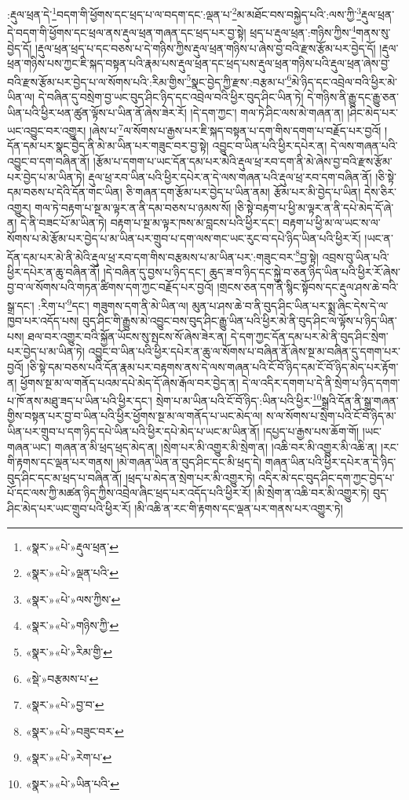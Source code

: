 :རྡུལ་ཕྲན་དེ་\footnote{«སྣར་»«པེ་»རྡུལ་ཕྲན་}བདག་གི་ཕྱོགས་དང་ཕྲད་པ་ལ་བདག་དང་:ལྡན་པ་\footnote{«སྣར་»«པེ་»ལྡན་པའི་}མ་མཐོང་བས་བསྐྱེད་པའི་:ལས་ཀྱི་\footnote{«སྣར་»«པེ་»ལས་ཀྱིས་}རྡུལ་ཕྲན་དེ་བདག་གི་ཕྱོགས་དང་ཕྲལ་ནས་རྡུལ་ཕྲན་གཞན་དང་ཕྲད་པར་བྱ་སྟེ། ཕྲད་པ་རྡུལ་ཕྲན་:གཉིས་ཀྱིས་\footnote{«སྣར་»«པེ་»གཉིས་ཀྱི་}གནས་སུ་བྱེད་དོ། །རྡུལ་ཕྲན་ཕྲད་པ་དང་བཅས་པ་དེ་གཉིས་ཀྱིས་རྡུལ་ཕྲན་གཉིས་པ་ཞེས་བྱ་བའི་རྫས་རྩོམ་པར་བྱེད་དོ། །རྡུལ་ཕྲན་གཉིས་པས་ཀྱང་ཇི་སྐད་བསྟན་པའི་རྣམ་པས་རྡུལ་ཕྲན་དང་ཕྲད་པས་རྡུལ་ཕྲན་གཉིས་པའི་རྡུལ་ཕྲན་ཞེས་བྱ་བའི་རྫས་རྩོམ་པར་བྱེད་པ་ལ་སོགས་པའི་:རིམ་གྱིས་\footnote{«སྣར་»«པེ་»རིམ་གྱི་}སྣང་བྱེད་ཀྱི་རྫས་:བརྩམ་པ་\footnote{«སྡེ་»བརྩམས་པ་}མེ་ཉིད་དང་འབྲེལ་བའི་ཕྱིར་མེ་ཡིན་ལ། དེ་བཞིན་དུ་བསྲེག་བྱ་ཡང་བུད་ཤིང་ཉིད་དང་འབྲེལ་བའི་ཕྱིར་བུད་ཤིང་ཡིན་ཏེ། དེ་གཉིས་ནི་རྒྱུ་དང་རྒྱུ་ཅན་ཡིན་པའི་ཕྱིར་ཕན་ཚུན་ལྟོས་པ་ཡིན་ནོ་ཞེས་ཟེར་རོ། །དེ་དག་ཀྱང་། གལ་ཏེ་ཤིང་ལས་མེ་གཞན་ན། །ཤིང་མེད་པར་ཡང་འབྱུང་བར་འགྱུར། །ཞེས་པ་\footnote{«སྣར་»«པེ་»བྱ་བ་}ལ་སོགས་པ་རྒྱས་པར་ཇི་སྐད་བསྟན་པ་དག་གིས་དགག་པ་བརྗོད་པར་བྱའོ། །དོན་དམ་པར་སྣང་བྱེད་ནི་མེ་མ་ཡིན་པར་གཟུང་བར་བྱ་སྟེ། འབྱུང་བ་ཡིན་པའི་ཕྱིར་དཔེར་ན། དེ་ལས་གཞན་པའི་འབྱུང་བ་དག་བཞིན་ནོ། །རྩོམ་པ་དགག་པ་ཡང་དོན་དམ་པར་མེའི་རྡུལ་ཕྲ་རབ་དག་ནི་མེ་ཞེས་བྱ་བའི་རྫས་རྩོམ་པར་བྱེད་པ་མ་ཡིན་ཏེ། རྡུལ་ཕྲ་རབ་ཡིན་པའི་ཕྱིར་དཔེར་ན་དེ་ལས་གཞན་པའི་རྡུལ་ཕྲ་རབ་དག་བཞིན་ནོ། །ཅི་སྟེ་དམ་བཅས་པ་དེའི་དོན་གང་ཡིན། ཅི་གཞན་དག་རྩོམ་པར་བྱེད་པ་ཡིན་ནམ། རྩོམ་པར་མི་བྱེད་པ་ཡིན། དེས་ཅིར་འགྱུར། གལ་ཏེ་བརྟག་པ་སྔ་མ་ལྟར་ན་ནི་དམ་བཅས་པ་ཉམས་སོ། །ཅི་སྟེ་བརྟག་པ་ཕྱི་མ་ལྟར་ན་ནི་དཔེ་མེད་དོ་ཞེ་ན། དེ་ནི་བཟང་པོ་མ་ཡིན་ཏེ། བརྟག་པ་སྔ་མ་ལྟར་ཁས་མ་བླངས་པའི་ཕྱིར་དང་། བརྟག་པ་ཕྱི་མ་ལ་ཡང་ས་ལ་སོགས་པ་མེ་རྩོམ་པར་བྱེད་པ་མ་ཡིན་པར་གྲུབ་པ་དག་ལས་གང་ཡང་རུང་བ་དཔེ་ཉིད་ཡིན་པའི་ཕྱིར་རོ། །ཡང་ན་དོན་དམ་པར་མེ་ནི་མེའི་རྡུལ་ཕྲ་རབ་དག་གིས་བརྩམས་པ་མ་ཡིན་པར་:གཟུང་བར་\footnote{«སྣར་»«པེ་»བཟུང་བར་}བྱ་སྟེ། འབྲས་བུ་ཡིན་པའི་ཕྱིར་དཔེར་ན་ཆུ་བཞིན་ནོ། །དེ་བཞིན་དུ་བྱས་པ་ཉིད་དང་། ཆུད་ཟ་བ་ཉིད་དང་སྐྱེ་བ་ཅན་ཉིད་ཡིན་པའི་ཕྱིར་རོ་ཞེས་བྱ་བ་ལ་སོགས་པའི་གཏན་ཚིགས་དག་ཀྱང་བརྗོད་པར་བྱའོ། །གྲངས་ཅན་དག་ནི་སྙིང་སྟོབས་དང་རྡུལ་ཤས་ཆེ་བའི་སྒྲ་དང་། :རིག་པ་\footnote{«སྣར་»«པེ་»རེག་པ་}དང་། གཟུགས་དག་ནི་མེ་ཡིན་ལ། མུན་པ་ཤས་ཆེ་བ་ནི་བུད་ཤིང་ཡིན་པར་སྨྲ་ཞིང་དེས་དེ་ལ་ཁྱབ་པར་འདོད་པས། བུད་ཤིང་གི་རྒྱུས་མེ་འབྱུང་བས་བུད་ཤིང་རྒྱུ་ཡིན་པའི་ཕྱིར་མེ་ནི་བུད་ཤིང་ལ་ལྟོས་པ་ཉིད་ཡིན་པས། ཐལ་བར་འགྱུར་བའི་སྐྱོན་ཡོངས་སུ་སྤངས་སོ་ཞེས་ཟེར་ན། དེ་དག་ཀྱང་དོན་དམ་པར་མེ་ནི་བུད་ཤིང་སྲེག་པར་བྱེད་པ་མ་ཡིན་ཏེ། འབྱུང་བ་ཡིན་པའི་ཕྱིར་དཔེར་ན་ཆུ་ལ་སོགས་པ་བཞིན་ནོ་ཞེས་སྔ་མ་བཞིན་དུ་དགག་པར་བྱའོ། །ཅི་སྟེ་དམ་བཅས་པའི་དོན་རྣམ་པར་བརྟགས་ནས་དེ་ལས་གཞན་པའི་ངོ་བོ་ཉིད་དམ་ངོ་བོ་ཉིད་མེད་པར་རྟོག་ན། ཕྱོགས་སྔ་མ་ལ་གནོད་པའམ་དཔེ་མེད་དོ་ཞེས་རྒོལ་བར་བྱེད་ན། དེ་ལ་འདིར་དགག་པ་དེ་ནི་སྲེག་པ་ཉིད་དགག་པ་ཁོ་ནས་མཐུ་ཟད་པ་ཡིན་པའི་ཕྱིར་དང་། སྲེག་པ་མ་ཡིན་པའི་ངོ་བོ་ཉིད་:ཡིན་པའི་ཕྱིར་\footnote{«སྣར་»«པེ་»ཡིན་པའི་}སྒྲའི་དོན་ནི་སྒྲ་གཞན་གྱིས་བསྟན་པར་བྱ་བ་ཡིན་པའི་ཕྱིར་ཕྱོགས་སྔ་མ་ལ་གནོད་པ་ཡང་མེད་ལ། ས་ལ་སོགས་པ་སྲེག་པའི་ངོ་བོ་ཉིད་མ་ཡིན་པར་གྲུབ་པ་དག་ཉིད་དཔེ་ཡིན་པའི་ཕྱིར་དཔེ་མེད་པ་ཡང་མ་ཡིན་ནོ། །དཔྱད་པ་རྒྱས་པས་ཆོག་གོ། །ཡང་གཞན་ཡང་། གཞན་ན་མི་ཕྲད་ཕྲད་མེད་ན། །སྲེག་པར་མི་འགྱུར་མི་སྲེག་ན། །འཆི་བར་མི་འགྱུར་མི་འཆི་ན། །རང་གི་རྟགས་དང་ལྡན་པར་གནས། །མེ་གཞན་ཡིན་ན་བུད་ཤིང་དང་མི་ཕྲད་དེ། གཞན་ཡིན་པའི་ཕྱིར་དཔེར་ན་དེ་ཉིད་བུད་ཤིང་དང་མ་ཕྲད་པ་བཞིན་ནོ། །ཕྲད་པ་མེད་ན་སྲེག་པར་མི་འགྱུར་ཏེ། འདིར་མེ་དང་བུད་ཤིང་དག་ཀྱང་བྱེད་པ་པོ་དང་ལས་ཀྱི་མཚན་ཉིད་ཀྱིས་འབྲེལ་ཞིང་ཕྲད་པར་འདོད་པའི་ཕྱིར་རོ། །མི་སྲེག་ན་འཆི་བར་མི་འགྱུར་ཏེ། བུད་ཤིང་མེད་པར་ཡང་གྲུབ་པའི་ཕྱིར་རོ། །མི་འཆི་ན་རང་གི་རྟགས་དང་ལྡན་པར་གནས་པར་འགྱུར་ཏེ། 